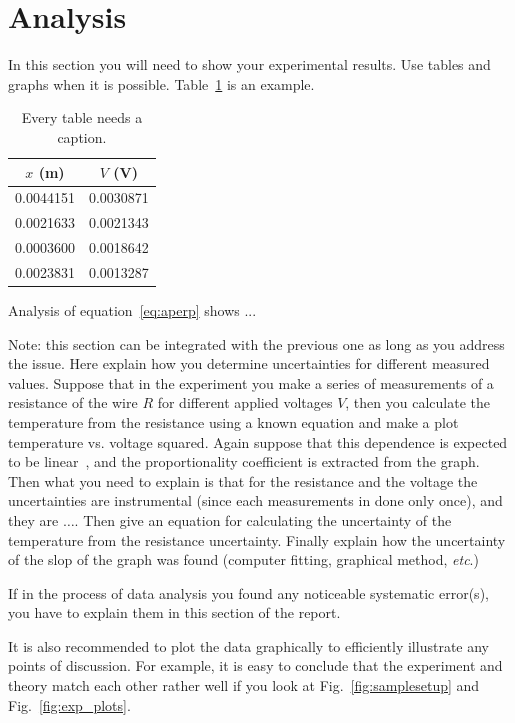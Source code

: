 \documentclass[letterpaper,12pt]{article}
\begin{document}
\section{Analysis}

In this section you will need to show your experimental results. Use tables and
graphs when it is possible. Table~\ref{tbl:bins} is an example.

\begin{table}[ht]
\begin{center}
\caption{Every table needs a caption.}
\label{tbl:bins} %
\begin{tabular}{|cc|} 
\hline
\multicolumn{1}{|c}{$x$ (m)} & \multicolumn{1}{c|}{$V$ (V)} \\
\hline
0.0044151 &   0.0030871 \\
0.0021633 &   0.0021343 \\
0.0003600 &   0.0018642 \\
0.0023831 &   0.0013287 \\
\hline
\end{tabular}
\end{center}
\end{table}

Analysis of equation~\ref{eq:aperp} shows ...

Note: this section can be integrated with the previous one as long as you
address the issue. Here explain how you determine uncertainties for different
measured values. Suppose that in the experiment you make a series of
measurements of a resistance of the wire $R$ for different applied voltages
$V$, then you calculate the temperature from the resistance using a known
equation and make a plot  temperature vs. voltage squared. Again suppose that
this dependence is expected to be linear~\cite{Cyr}, and the proportionality coefficient
is extracted from the graph. Then what you need to explain is that for the
resistance and the voltage the uncertainties are instrumental (since each
measurements in done only once), and they are $\dots$. Then give an equation
for calculating the uncertainty of the temperature from the resistance
uncertainty. Finally explain how the uncertainty of the slop of the graph was
found (computer fitting, graphical method, \emph{etc}.)

If in the process of data analysis you found any noticeable systematic
error(s), you have to explain them in this section of the report.

It is also recommended to plot the data graphically to efficiently illustrate
any points of discussion. For example, it is easy to conclude that the
experiment and theory match each other rather well if you look at
Fig.~\ref{fig:samplesetup} and Fig.~\ref{fig:exp_plots}.
\end{document}
